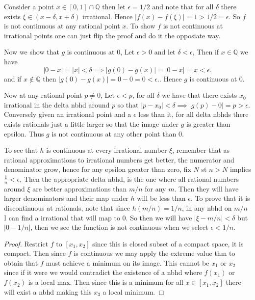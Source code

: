 \documentclass[11pt,largemargins]{homework}
\newcommand{\Q}{\mathbb{Q}}
\begin{document}
    \question 
    Consider a point $x \in [0, 1] \cap \Q$ then let $\epsilon = 1/2$ and note that for all $\delta$ there exists $\xi \in (x- \delta, x+\delta)$ irrational. Hence $|f(x) - f(\xi)| = 1 > 1/2 = \epsilon$. So $f$ is not continuous at any rational point $x$. 
    To show $f$ is not continuous at irrational points one can just flip the proof and do it the opposiate way. 


    Now we show that $g$ is continuous at $0$, Let $\epsilon > 0$ and 
    let $\delta < \epsilon$, Then if $x \in \Q$ we have 
    \[|0 - x| = |x| < \delta \implies |g(0) - g(x)| = |0 - x| = x < \epsilon.\]
    and if $x \notin \Q$ then $|g(0) - g(x)| = 0 - 0 = 0 < \epsilon.$. 
    Hence $g$ is continuous at 0. 

    Now at any rational point $p \neq 0$, Let $\epsilon < p$, for all $\delta$ we have that there exists $x_0$ 
    irrational in the delta nbhd around $p$ so that $|p - x_0| < \delta \implies |g(p) - 0| = p > \epsilon$. 
    Conversely given an irrational point and a $\epsilon$ less than it, for all delta nbhds there exists rationals 
    just a little larger so that the image under $g$ is greater than epsilon. 
    Thus $g$ is not continuous at any other point than $0$. 
    
    
    To see that $h$ is continuous at every irrational number $\xi$, remember that 
    as rational approximations to irrational numbers get better, the numerator and denominator grow, hence for any epsilon greater than zero, 
    fix $N$ st $n > N$ implies $\frac{1}{n} < \epsilon$, Then the appropriate delta nbhd, 
    is the one where all rational numbers around $\xi$ are better approximations than $m/n$ for any $m$. Then they will have larger denominators and their map under $h$ will be less than $\epsilon$. 
    To prove that it is discontinuous at rationals, note that since $h(m/n) = 1/n$, in any nbhd on $m/n$ I can find a irrational that will map to 0. So then 
    we will have $|\xi - m/n| < \delta $ but $|0 - 1/n|$, then we see the function is not continuous when we select $\epsilon < 1/n$. 


    \question 
    \begin{proof}
        Restrict $f$ to $[x_1, x_2]$ since this is closed subset of a compact space, it is compact. 
        Then since $f$ is continuous we may apply the extreme value thm to obtain that $f$ must achieve a minimum 
        on its image. This cannot be $x_1$ or $x_2$ since if it were we would contradict the existence 
        of a nbhd where $f(x_1)$ or $f(x_2)$ is a local max. Then since this is a minimum for all $x \in [x_1, x_2]$ there will exist a nbhd making this $x_3$ 
        a local minimum. 
    \end{proof}
\end{document}

